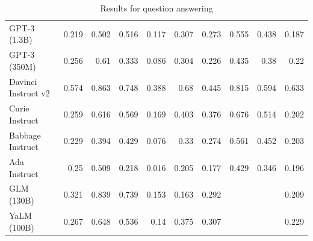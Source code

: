 \begin{table}[htp]
{\begin{tabular}{lrrrrrrrrr}
GPT-3 (1.3B) & 0.219 & 0.502 & 0.516 & 0.117 & 0.307 & 0.273 & 0.555 & 0.438 & 0.187 \\
GPT-3 (350M) & 0.256 & 0.61 & 0.333 & 0.086 & 0.304 & 0.226 & 0.435 & 0.38 & 0.22 \\
Davinci Instruct v2 & 0.574 & 0.863 & 0.748 & 0.388 & 0.68 & 0.445 & 0.815 & 0.594 & 0.633 \\
Curie Instruct & 0.259 & 0.616 & 0.569 & 0.169 & 0.403 & 0.376 & 0.676 & 0.514 & 0.202 \\
Babbage Instruct & 0.229 & 0.394 & 0.429 & 0.076 & 0.33 & 0.274 & 0.561 & 0.452 & 0.203 \\
Ada Instruct & 0.25 & 0.509 & 0.218 & 0.016 & 0.205 & 0.177 & 0.429 & 0.346 & 0.196 \\
GLM (130B) & 0.321 & 0.839 & 0.739 & 0.153 & 0.163 & 0.292 &  &  & 0.209 \\
YaLM (100B) & 0.267 & 0.648 & 0.536 & 0.14 & 0.375 & 0.307 &  &  & 0.229 \\
\bottomrule
\end{tabular}}
\caption{Results for question answering}
\label{fig:accuracy (question_answering)}
\end{table}